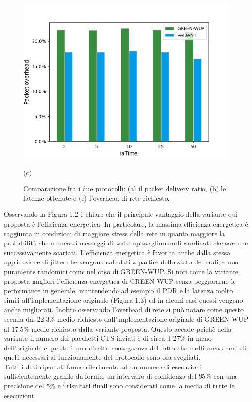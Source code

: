 \documentclass{report}
\begin{document}
\begin{figure}
\begin{minipage}{.5\textwidth}
        \includegraphics[width=1\linewidth]{overhead_plot.png}
        \caption*{(c)}
    \end{minipage}%
    \caption{Comparazione fra i due protocolli: (a) il packet delivery ratio, (b) le latenze ottenute e (c) l'overhead di rete richiesto.}
\end{figure}


Osservando la Figura 1.2 è chiaro che il principale vantaggio della variante qui proposta è l'efficienza energetica. In particolare, la massima efficienza
energetica è raggiunta in condizioni di maggiore stress della rete in quanto maggiore la probabilità che numerosi messaggi di wake up sveglino
nodi candidati che saranno successivamente scartati. L'efficienza energetica è favorita anche dalla stessa applicazione di jitter che
vengono calcolati a partire dallo stato dei nodi, e non puramente randomici come nel caso di GREEN-WUP. Si noti come la variante proposta migliori
l'efficienza energetica di GREEN-WUP senza peggiorarne le performance in generale, mantendendo ad esempio il PDR e la latenza molto simili
all'implementazione originale (Figura 1.3) ed in alcuni casi questi vengono anche migliorati. Inoltre osservando l'overhead di rete
si può notare come questo scenda dal 22.3\% medio richiesto dall'implementazione originale di GREEN-WUP al 17.5\% medio richiesto dalla variante
proposta. Questo accade poichè nella variante il numero dei pacchetti CTS inviati è di circa il 27\% in meno dell'originale e questa è una
diretta conseguenza del fatto che molti meno nodi di quelli necessari al funzionamento del protocollo sono ora svegliati.\\

Tutti i dati riportati fanno riferimento ad un numero di esecuzioni sufficientemente grande da fornire un intervallo di confidenza del 95\% con una precisione
del 5\% e i risultati finali sono considerati come la media di tutte le esecuzioni.

\end{document}
